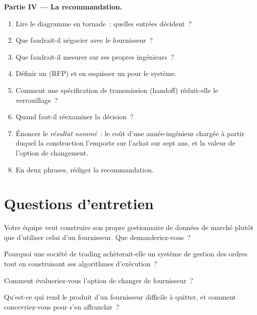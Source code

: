 \begin{problem}
\medskip\noindent\textbf{Partie IV --- La recommandation.}
\begin{enumerate}[resume]
\item Lire le diagramme en tornade~: quelles entrées décident~?
\item Que faudrait-il négocier avec le fournisseur~?
\item Que faudrait-il mesurer sur ses propres ingénieurs~?
\item Définir un  (RFP) et en esquisser un pour le système.
\item Comment une spécification de transmission (handoff) réduit-elle le verrouillage~?
\item Quand faut-il réexaminer la décision~?
\item Énoncer le \emph{résultat nommé}~: le coût d'une année-ingénieur chargée à partir duquel la construction
l'emporte sur l'achat sur sept ans, et la valeur de l'option de changement.
\item En deux phrases, rédiger la recommandation.
\end{enumerate}
\end{problem}

\section{Questions d'entretien}

\begin{interviewq}\label{iq:fm:build-against-buy:1}
Votre équipe veut construire son propre gestionnaire de données de marché plutôt que d'utiliser celui d'un fournisseur. Que demanderiez-vous~?
\end{interviewq}

\begin{interviewq}\label{iq:fm:build-against-buy:2}
Pourquoi une société de trading achèterait-elle un système de gestion des ordres tout en construisant ses algorithmes d'exécution~?
\end{interviewq}

\begin{interviewq}\label{iq:fm:build-against-buy:3}
Comment évalueriez-vous l'option de changer de fournisseur~?
\end{interviewq}

\begin{interviewq}\label{iq:fm:build-against-buy:4}
Qu'est-ce qui rend le produit d'un fournisseur difficile à quitter, et comment concevriez-vous pour s'en affranchir~?
\end{interviewq}

